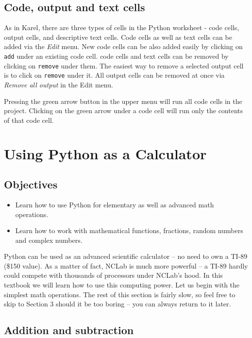 \documentclass[article,A4,12pt]{llncs}
\begin{document}
\subsection{Code, output and text cells}

As in Karel, there are three types of cells in the Python worksheet - code cells, output cells, 
and descriptive text cells. Code cells as well as text cells can be added via 
the {\em Edit} menu. New code cells can be also added easily by clicking on {\tt add} under
an existing code cell. code cells and text cells can be removed by clicking on 
{\tt remove} under them. The easiest way to remove a selected output cell is to 
click on {\tt remove} under it.  
All output cells can be removed at once via {\em Remove all output} in the Edit menu. 

Pressing the green arrow button in the upper menu will run all code cells in the project. 
Clicking on the green arrow under a code cell will run only the contents of that code cell. 


\section{Using Python as a Calculator} \label{sec:calc}

\subsection{Objectives}

\begin{itemize}
\item Learn how to use Python for elementary as well as advanced math operations.
\item Learn how to work with mathematical functions, fractions, random numbers 
      and complex numbers.
\end{itemize}
Python can be used as an advanced scientific calculator -- no need to own a TI-89 (\$150 value). 
As a matter of fact, NCLab is much more powerful -- a TI-89 hardly could compete with thousands 
of processors under NCLab's hood. 
In this textbook we will learn how to use this computing power. Let us begin with the simplest math 
operations. The rest of this section is fairly slow, so feel free to skip to Section 3
should it be too boring -- you can always return to it later.

\subsection{Addition and subtraction}
\end{document}
